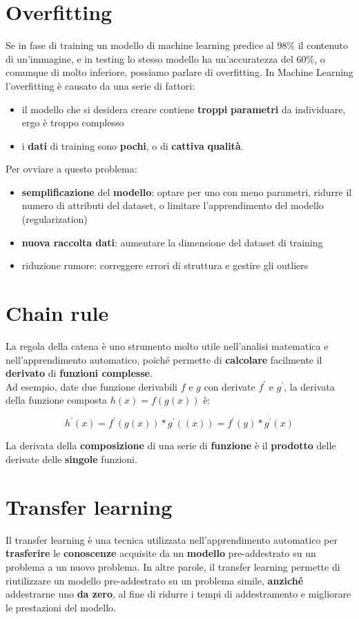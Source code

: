 \documentclass{article}
\begin{document}
\section{Overfitting}
Se in fase di training un modello di machine learning predice al $98\%$ il contenuto di un’immagine, e in testing lo stesso modello ha un’accuratezza del $60\%$, o comunque di molto inferiore, possiamo parlare di overfitting.
In Machine Learning l’overfitting è causato da una serie di fattori:
\begin{itemize}
    \item il modello che si desidera creare contiene \textbf{troppi} \textbf{parametri} da individuare, ergo è troppo complesso
    \item i \textbf{dati} di training sono \textbf{pochi}, o di \textbf{cattiva} \textbf{qualità}.
\end{itemize}
Per ovviare a questo problema:
\begin{itemize}
    \item \textbf{semplificazione} del \textbf{modello}: optare per uno con meno parametri, ridurre il numero di attributi del dataset, o limitare l’apprendimento del modello (regularization)
    \item \textbf{nuova raccolta dati}: aumentare la dimensione del dataset di training
    \item riduzione rumore: correggere errori di struttura e gestire gli outliers
\end{itemize}


\section{Chain rule}
La regola della catena è uno strumento molto utile nell'analisi matematica e nell'apprendimento automatico, poiché permette di \textbf{calcolare} facilmente il \textbf{derivato} di \textbf{funzioni complesse}. \\
Ad esempio, date due funzione derivabili $f$ e $g$ con derivate $f^{'}$ e $g^{'}$, la derivata della funzione composta $h(x) = f(g(x))$ è:

$$h^{'}(x) = f^{'}(g(x)) * g^{'}((x)) =  f^{'}(y) * g^{'}(x)$$

La derivata della \textbf{composizione} di una serie di \textbf{funzione} è il \textbf{prodotto} delle derivate delle \textbf{singole} funzioni.


\section{Transfer learning}
Il transfer learning è una tecnica utilizzata nell'apprendimento automatico per \textbf{trasferire} le \textbf{conoscenze} acquisite da un \textbf{modello} pre-addestrato su un problema a un nuovo problema. In altre parole, il transfer learning permette di riutilizzare un modello pre-addestrato su un problema simile, \textbf{anziché} addestrarne uno \textbf{da zero}, al fine di ridurre i tempi di addestramento e migliorare le prestazioni del modello.
\end{document}

